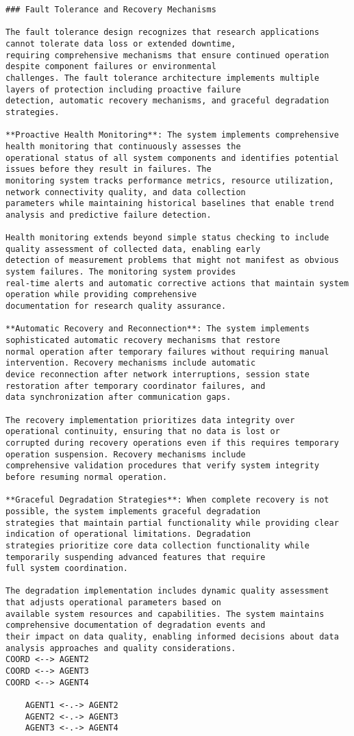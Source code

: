 \documentclass[12pt,a4paper]{report}
\begin{document}
\begin{verbatim}
### Fault Tolerance and Recovery Mechanisms

The fault tolerance design recognizes that research applications cannot tolerate data loss or extended downtime,
requiring comprehensive mechanisms that ensure continued operation despite component failures or environmental
challenges. The fault tolerance architecture implements multiple layers of protection including proactive failure
detection, automatic recovery mechanisms, and graceful degradation strategies.

**Proactive Health Monitoring**: The system implements comprehensive health monitoring that continuously assesses the
operational status of all system components and identifies potential issues before they result in failures. The
monitoring system tracks performance metrics, resource utilization, network connectivity quality, and data collection
parameters while maintaining historical baselines that enable trend analysis and predictive failure detection.

Health monitoring extends beyond simple status checking to include quality assessment of collected data, enabling early
detection of measurement problems that might not manifest as obvious system failures. The monitoring system provides
real-time alerts and automatic corrective actions that maintain system operation while providing comprehensive
documentation for research quality assurance.

**Automatic Recovery and Reconnection**: The system implements sophisticated automatic recovery mechanisms that restore
normal operation after temporary failures without requiring manual intervention. Recovery mechanisms include automatic
device reconnection after network interruptions, session state restoration after temporary coordinator failures, and
data synchronization after communication gaps.

The recovery implementation prioritizes data integrity over operational continuity, ensuring that no data is lost or
corrupted during recovery operations even if this requires temporary operation suspension. Recovery mechanisms include
comprehensive validation procedures that verify system integrity before resuming normal operation.

**Graceful Degradation Strategies**: When complete recovery is not possible, the system implements graceful degradation
strategies that maintain partial functionality while providing clear indication of operational limitations. Degradation
strategies prioritize core data collection functionality while temporarily suspending advanced features that require
full system coordination.

The degradation implementation includes dynamic quality assessment that adjusts operational parameters based on
available system resources and capabilities. The system maintains comprehensive documentation of degradation events and
their impact on data quality, enabling informed decisions about data analysis approaches and quality considerations.
COORD <--> AGENT2
COORD <--> AGENT3
COORD <--> AGENT4

    AGENT1 <-.-> AGENT2
    AGENT2 <-.-> AGENT3
    AGENT3 <-.-> AGENT4

\end{verbatim}
\end{document}
